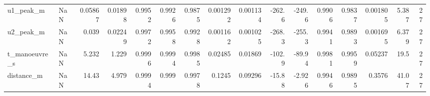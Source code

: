 \begin{table}
\begin{tabular}{llrrrrrrrrrrrrrr}
u1\_peak\_m & NaN & 0.05867 & 0.01898 & 0.9952 & 0.9926 & 0.9875 & 0.001292 & 0.001134 & -262.6 & -249.6 & 0.9906 & 0.9837 & 0.001805 & 5.387 & 27 \\
u2\_peak\_m & NaN & 0.039 & 0.02249 & 0.9972 & 0.9958 & 0.9928 & 0.001162 & 0.001025 & -268.3 & -255.3 & 0.9941 & 0.9893 & 0.001695 & 6.379 & 27 \\
t\_manoeuvre\_s & NaN & 5.232 & 1.229 & 0.9996 & 0.9994 & 0.9985 & 0.02485 & 0.01869 & -102.9 & -89.94 & 0.9981 & 0.9959 & 0.05237 & 19.5 & 27 \\
distance\_m & NaN & 14.43 & 4.979 & 0.9994 & 0.999 & 0.9978 & 0.1245 & 0.09296 & -15.88 & -2.926 & 0.9946 & 0.9895 & 0.3576 & 41.07 & 27 \\
\bottomrule
\end{tabular}
\end{table}
